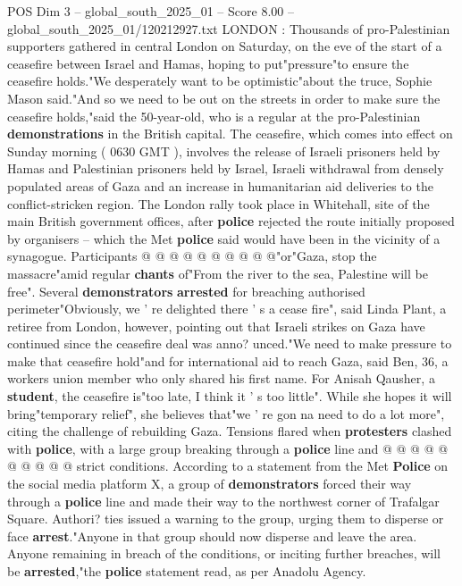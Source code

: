 \begin{textsample}{POS Dim 3 – global\_south\_2025\_01 – Score 8.00 – global\_south\_2025\_01/120212927.txt}  \label{ex:f3_pos_385}
LONDON : Thousands of pro-Palestinian supporters gathered in central London on Saturday, on the eve of the start of a ceasefire between Israel and Hamas, hoping to put"pressure"to ensure the ceasefire holds."We desperately want to be optimistic"about the truce, Sophie Mason said."And so we need to be out on the streets in order to make sure the ceasefire holds,"said the 50-year-old, who is a regular at the pro-Palestinian \textbf{demonstrations} in the British capital.
The ceasefire, which comes into effect on Sunday morning ( 0630 GMT ), involves the release of Israeli prisoners held by Hamas and Palestinian prisoners held by Israel, Israeli withdrawal from densely populated areas of Gaza and an increase in humanitarian aid deliveries to the conflict-stricken region.
The London rally took place in Whitehall, site of the main British government offices, after \textbf{police} rejected the route initially proposed by organisers -- which the Met \textbf{police} said would have been in the vicinity of a synagogue.
Participants @ @ @ @ @ @ @ @ @ @"or"Gaza, stop the massacre"amid regular \textbf{chants} of"From the river to the sea, Palestine will be free".
Several \textbf{demonstrators} \textbf{arrested} for breaching authorised perimeter"Obviously, we ' re delighted there ' s a cease fire", said Linda Plant, a retiree from London, however, pointing out that Israeli strikes on Gaza have continued since the ceasefire deal was anno? unced."We need to make pressure to make that ceasefire hold"and for international aid to reach Gaza, said Ben, 36, a workers union member who only shared his first name.
For Anisah Qausher, a \textbf{student}, the ceasefire is"too late, I think it ' s too little".
While she hopes it will bring"temporary relief", she believes that"we ' re gon na need to do a lot more", citing the challenge of rebuilding Gaza.
Tensions flared when \textbf{protesters} clashed with \textbf{police}, with a large group breaking through a \textbf{police} line and @ @ @ @ @ @ @ @ @ @ strict conditions.
According to a statement from the Met \textbf{Police} on the social media platform X, a group of \textbf{demonstrators} forced their way through a \textbf{police} line and made their way to the northwest corner of Trafalgar Square.
Authori? ties issued a warning to the group, urging them to disperse or face \textbf{arrest}."Anyone in that group should now disperse and leave the area.
Anyone remaining in breach of the conditions, or inciting further breaches, will be \textbf{arrested},"the \textbf{police} statement read, as per Anadolu Agency.

\end{textsample}
